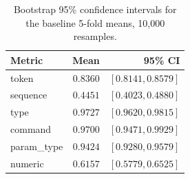 \begin{table}[h]
\centering
\caption{Bootstrap 95\% confidence intervals for the baseline 5-fold means, 10{,}000 resamples.}
\label{tab:bootstrap_ci}
\begin{tabular}{l r r}
\toprule
Metric & Mean & 95\% CI \\
\midrule
token & $0.8360$ & $[0.8141, 0.8579]$ \\
sequence & $0.4451$ & $[0.4023, 0.4880]$ \\
type & $0.9727$ & $[0.9620, 0.9815]$ \\
command & $0.9700$ & $[0.9471, 0.9929]$ \\
param\_type & $0.9424$ & $[0.9280, 0.9579]$ \\
numeric & $0.6157$ & $[0.5779, 0.6525]$ \\
\bottomrule
\end{tabular}
\end{table}